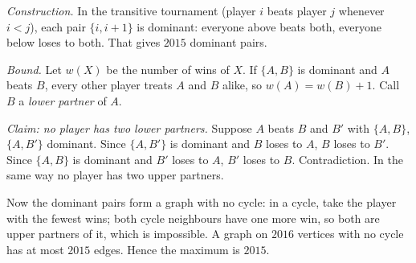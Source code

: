 \emph{Construction.} In the transitive tournament (player $i$ beats player $j$ whenever $i<j$), each pair $\{i,i+1\}$ is dominant: everyone above beats both, everyone below loses to both. That gives $2015$ dominant pairs.

\emph{Bound.} Let $w(X)$ be the number of wins of $X$. If $\{A,B\}$ is dominant and $A$ beats $B$, every other player treats $A$ and $B$ alike, so $w(A)=w(B)+1$. Call $B$ a \emph{lower partner} of $A$.

\emph{Claim: no player has two lower partners.} Suppose $A$ beats $B$ and $B'$ with $\{A,B\}$, $\{A,B'\}$ dominant. Since $\{A,B'\}$ is dominant and $B$ loses to $A$, $B$ loses to $B'$. Since $\{A,B\}$ is dominant and $B'$ loses to $A$, $B'$ loses to $B$. Contradiction. In the same way no player has two upper partners.

Now the dominant pairs form a graph with no cycle: in a cycle, take the player with the fewest wins; both cycle neighbours have one more win, so both are upper partners of it, which is impossible. A graph on $2016$ vertices with no cycle has at most $2015$ edges. Hence the maximum is $\boxed{2015}$.
